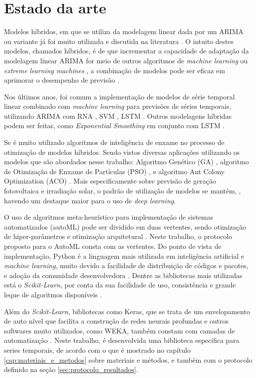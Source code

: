 \chapter{Estado da arte}
\label{cap:estado_da_arte}

Modelos híbridos, em que se utiliza da modelagem linear dada por um ARIMA ou variante já foi muito utilizada e discutida na literatura \cite{zhang2003time, khashei2010artificial, babu2014moving, de2014hybrid, de2016hybrid, domingos2019intelligent}. O intuito destes modelos, chamados híbridos, é de que incrementar a capacidade de adaptação da modelagem linear ARIMA for meio de outros algoritmos de \textit{machine learning} ou \textit{extreme learning machines} \cite{yu2020hybrid}, a combinação de modelos pode ser eficaz em aprimorar o desempenho de previsão \cite{khashei2012new}.

Nos últimos anos, foi comum a implementação de modelos de série temporal linear combinado com \textit{machine learning} para previsões de séries temporais, utilizando ARIMA com RNA \cite{xiong2017hybrid}, SVM \cite{domingos2019intelligent}, LSTM \cite{choi2018stock, qing2018hourly, zang2020short}. Outros modelagens híbridas podem ser feitas, como \textit{Exponential Smoothing} em conjunto com LSTM \cite{smyl2020hybrid}.

Se é muito utilizado algoritmos de inteligência de enxame no processo de otimização de modelos híbridos. Sendo vistos diversas aplicações utilizando os modelos que são abordados nesse trabalho: Algoritmo Genético (GA) \cite{huang2012hybrid}, algoritmo de Otimização de Enxame de Partículas (PSO) \cite{bagheri2014financial, pradeepkumar2017forecasting}, e algoritmo Ant Colony Optimization (ACO) \cite{shen2013optimal}. Mais especificamente sobre previsão de geração fotovoltaica e irradiação solar, o padrão de utilização de modelos se mantém, \cite{sobri2018solar, wang2019review}, havendo um destaque maior para o uso de \textit{deep learning}.

O uso de algoritmos meta-heurístico para implementação de sistemas automatizados (autoML) pode ser dividido em duas vertentes, sendo otimização de hiper-parâmetros e otimização arquitetural \cite{he2021automl}. Neste trabalho, o protocolo proposto para o AutoML consta com as vertentes. Do ponto de vista de implementação, Python é a linguagem mais utilizada em inteligência artificial e \textit{machine learning}, muito devido a facilidade de distribuição de códigos e pacotes, e adoção da comunidade desenvolvedora \cite{blank2020pymoo}. Dentre as bibliotecas mais utilizadas está o \textit{Scikit-Learn}, por conta da sua facilidade de uso, consistência e grande leque de algoritmos disponíveis \cite{scikit-learn, hackeling2017mastering}. 

Além do \textit{Scikit-Learn}, bibliotecas como Keras, que se trata de um envelopamento de auto nível que facilita a construção de redes neurais profundas \cite{jin2019auto} e outros softwares muito utilizados, como WEKA, também constam com camadas de automatização \cite{feurer2020auto}. Neste trabalho, é desenvolvida uma biblioteca específica para series temporais, de acordo com o que é mostrado no capítulo \ref{cap:materiais_e_metodos} sobre materiais e métodos, e também com o protocolo definido na seção \ref{sec:protocolo_resultados}.